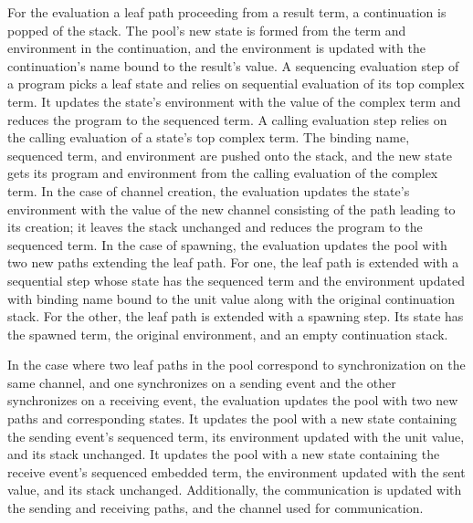 \documentclass[letterpaper, 11pt]{report}
\begin{document}
For the evaluation a leaf path proceeding from a result term, a continuation is popped of the
stack. The pool's new state is formed from the term and environment in the continuation, and
the environment is updated with the continuation's name bound to the result's value.
A sequencing evaluation step of a program picks a leaf state and relies on
sequential evaluation of its top complex term. It updates the state's environment with the
value of the complex term and reduces the program to the sequenced term.
A calling evaluation step relies on the calling evaluation of a state's top
complex term. The binding name, sequenced term, and environment are pushed onto the stack,
and the new state gets its program and environment from the calling evaluation of the complex term. 
In the case of channel creation, the evaluation updates the state's environment with the
value of the new channel consisting of the path leading to its creation; it leaves the stack
unchanged and reduces the program to the sequenced term.
In the case of spawning, the evaluation updates the pool with two
new paths extending the leaf path. For one, the leaf path is extended with a sequential
step whose state has the sequenced term and the environment updated
with binding name bound to the unit value along with the original continuation stack.
For the other, the leaf path is
extended with a spawning step.
Its state has the spawned term, the original environment, and an empty continuation stack. 

In the case where two leaf paths in the pool correspond to synchronization on the same channel,
and one synchronizes on a sending event and the other synchronizes on a receiving event, the
evaluation updates the pool with two new paths and corresponding states.
It updates the pool with a new state containing the sending event's sequenced term, its environment updated with the unit value, and its stack unchanged.
It updates the pool with a new state containing the receive event's sequenced embedded term,
the environment updated with the sent value, and its stack unchanged.
Additionally, the communication is updated with the sending and receiving paths,
and the channel used for communication. 
\end{document}

